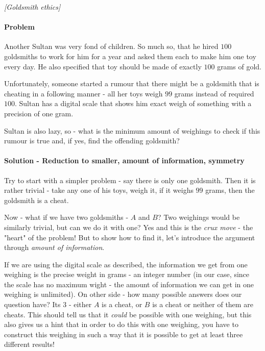 
%
%


\noindent 

\begin{problem}
\textit{[Goldsmith ethics]}

\paragraph{Problem}

Another Sultan was very fond of children. So much so, that he hired $100$ goldsmiths to work for him for a year and asked them each to make him one toy every day. He also specified that toy should be made of exactly $100$ grams of gold.

Unfortunately, someone started a rumour that there might be a goldsmith that is cheating in a following manner - all her toys weigh $99$ grams instead of required $100$. Sultan has a digital scale that shows him exact weigh of something with a precision of one gram. 

Sultan is also lazy, so - what is the minimum amount of weighings to check if this rumour is true and, if yes, find the offending goldsmith?

\paragraph{Solution - Reduction to smaller, amount of information, symmetry}

Try to start with a simpler problem - say there is only one goldsmith. Then it is rather trivial - take any one of his toys, weigh it, if it weighs $99$ grams, then the goldsmith is a cheat.

Now - what if we have two goldsmiths - $A$ and $B$? Two weighings would be similarly trivial, but can we do it with one? Yes and this is the \textit{crux move} - the "heart" of the problem! But to show how to find it, let's introduce the argument through \textit{amount of information}.

If we are using the digital scale as described, the information we get from one weighing is the precise weight in grams - an integer number (in our case, since the scale has no maximum wight - the amount of information we can get in one weighing is unlimited). 
On other side - how many possible answers does our question have? Its $3$ - either $A$ is a cheat, or $B$ is a cheat or neither of them are cheats. This should tell us that it \textit{could} be possible with one weighing, but this also gives us a hint that in order to do this with one weighing, you have to construct this weighing in such a way that it is possible to get at least three different results! 


\end{problem}
